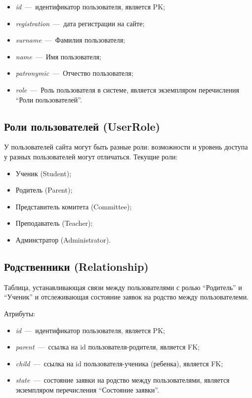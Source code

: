 \documentclass[14pt]{article}
\begin{document}
\begin{itemize}
	\item \emph{id}~---~идентификатор пользователя, является PK;
	\item \emph{registration}~---~дата регистрации на сайте;
	\item \emph{surname}~---~Фамилия пользователя;
	\item \emph{name}~---~Имя пользователя;
	\item \emph{patronymic}~---~Отчество пользователя;
	\item \emph{role}~---~Роль пользователя в системе, является экземпляром перечисления ``Роли пользователей''.
\end{itemize}

\subsection{Роли пользователей (UserRole)}

У пользователей сайта могут быть разные роли: возможности и уровень доступа у разных пользователей могут отличаться.
Текущие роли:
\begin{itemize}
	\item Ученик (Student);
	\item Родитель (Parent);
	\item Представитель комитета (Committee);
	\item Преподаватель (Teacher);
	\item Админстратор (Administrator).
\end{itemize}

\subsection{Родственники (Relationship)}

Таблица, устанавливающая связи между пользователями с ролью ``Родитель'' и ``Ученик'' и отслеживающая состояние заявок на родство между пользователеми.

Атрибуты:
\begin{itemize}
	\item \emph{id}~---~идентификатор пользователя, является PK;
	\item \emph{parent}~---~ссылка на id пользователя-родителя, является FK;
	\item \emph{child}~---~ссылка на id пользователя-ученика (ребенка), является FK;
	\item \emph{state}~---~состояние заявки на родство между пользователями, является экземпляром перечисления ``Состояние заявки''.
\end{itemize}
\end{document}
